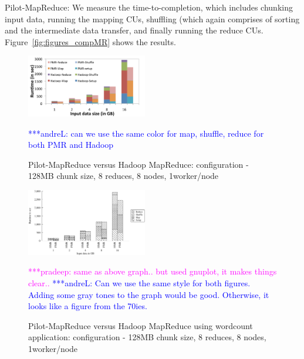 \documentclass{acm_proc_article-sp}
\newcommand{\alnote}[1]{ {\textcolor{blue} { ***andreL: #1 }}}
\newcommand{\pnote}[1]{ {\textcolor{magenta} { ***pradeep: #1 }}}
\newcommand{\alnote}[1]{}
\newcommand{\pnote}[1]{}
\newcommand{\pilotmapreduce}{Pilot-MapReduce\xspace}
\begin{document}
\pilotmapreduce: We measure the time-to-completion, which includes chunking input data, 
running the mapping CUs, shuffling (which again comprises of sorting and the intermediate 
data transfer, and finally running the reduce CUs. Figure~\ref{fig:figures_compMR} 
shows the results.


\begin{figure}[compPMRvsHMR]
	\centering
		\includegraphics[width=0.47\textwidth]{figures/wc_hadoopvspmr_stackcluster.pdf}
		\caption{Pilot-MapReduce versus Hadoop MapReduce: configuration - 128MB chunk size, 8 reduces, 8 nodes, 1worker/node} 
		\alnote{can we use the same color for map, shuffle, reduce for both PMR and Hadoop}
	\label{fig:figures_compPMRvsHMR}
\end{figure}	

\begin{figure}[compPMRvsHMR_gnuplot]
	\centering
		\includegraphics[width=0.47\textwidth]{figures/wordcount_hmr_pmr.pdf}
		\caption{Pilot-MapReduce versus Hadoop MapReduce using wordcount application: configuration - 128MB chunk size, 8 reduces, 8 nodes, 1worker/node} 
		\pnote{same as above graph.. but used gnuplot, it makes things clear..} \alnote{Can we use the same style for both figures. Adding some gray tones to the graph would be good. Otherwise, it looks like a figure from the 70ies.}
	\label{fig:figures_compPMRvsHMR_gnuplot}
\end{figure}		
	
\end{document}
